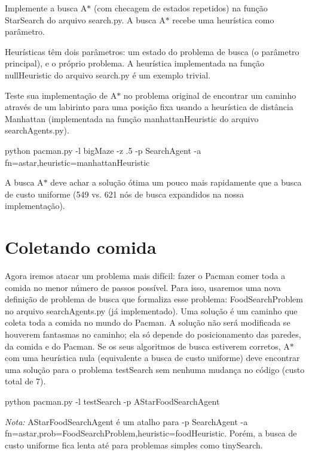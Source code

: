 Implemente a busca A$\ast$ (com checagem de estados repetidos) na função {\ttfamily Star\+Search} do arquivo {\ttfamily search.\+py}. A busca A$\ast$ recebe uma heurística como parâmetro.

Heurísticas têm dois parâmetros\+: um estado do problema de busca (o parâmetro principal), e o próprio problema. A heurística implementada na função {\ttfamily null\+Heuristic} do arquivo {\ttfamily search.\+py} é um exemplo trivial.

Teste sua implementação de A$\ast$ no problema original de encontrar um caminho através de um labirinto para uma posição fixa usando a heurística de distância Manhattan (implementada na função {\ttfamily manhattan\+Heuristic} do arquivo {\ttfamily search\+Agents.\+py}).


\begin{DoxyCode}
python pacman.py -l bigMaze -z .5 -p SearchAgent -a fn=astar,heuristic=manhattanHeuristic
\end{DoxyCode}


A busca A$\ast$ deve achar a solução ótima um pouco mais rapidamente que a busca de custo uniforme (549 vs. 621 nós de busca expandidos na nossa implementação).

\section*{Coletando comida}

Agora iremos atacar um problema mais difícil\+: fazer o Pacman comer toda a comida no menor número de passos possível. Para isso, usaremos uma nova definição de problema de busca que formaliza esse problema\+: {\ttfamily Food\+Search\+Problem} no arquivo {\ttfamily search\+Agents.\+py} (já implementado). Uma solução é um caminho que coleta toda a comida no mundo do Pacman. A solução não será modificada se houverem fantasmas no caminho; ela só depende do posicionamento das paredes, da comida e do Pacman. Se os seus algoritmos de busca estiverem corretos, A$\ast$ com uma heurística nula (equivalente a busca de custo uniforme) deve encontrar uma solução para o problema test\+Search sem nenhuma mudança no código (custo total de 7).


\begin{DoxyCode}
python pacman.py -l testSearch -p AStarFoodSearchAgent
\end{DoxyCode}


{\itshape Nota\+:} {\ttfamily A\+Star\+Food\+Search\+Agent} é um atalho para {\ttfamily -\/p Search\+Agent -\/a fn=astar,prob=Food\+Search\+Problem,heuristic=food\+Heuristic}. Porém, a busca de custo uniforme fica lenta até para problemas simples como {\ttfamily tiny\+Search}.

